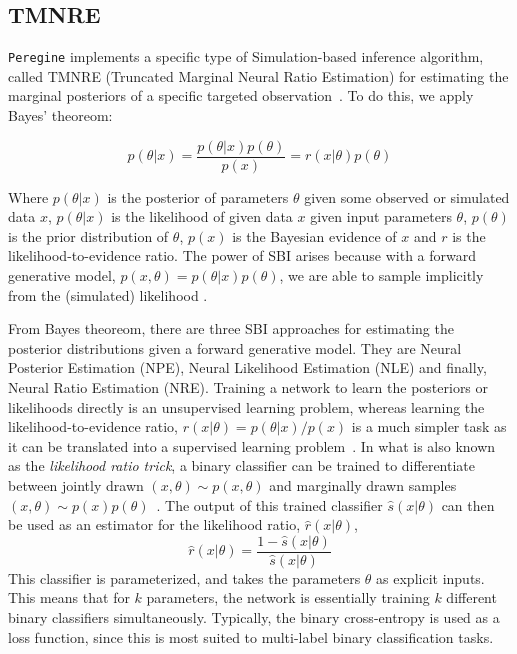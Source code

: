 \subsection{TMNRE}
\label{sec:tmnre}

\texttt{Peregine} implements a specific type of Simulation-based inference algorithm, called TMNRE (Truncated Marginal Neural Ratio Estimation) for estimating the marginal posteriors of a specific targeted observation~\cite{Miller_TMNRE_2021}. To do this, we apply Bayes' theoreom:

\begin{equation*}
    p(\theta|x) = \frac{p(\theta|x) p(\theta)}{p(x)} = r(x|\theta) p(\theta)
\end{equation*}

Where $p(\theta|x)$ is the posterior of parameters $\theta$ given some observed or simulated data $x$, $p(\theta|x)$ is the likelihood of given data $x$ given input parameters $\theta$, $p(\theta)$ is the prior distribution of $\theta$, $p(x)$ is the Bayesian evidence of $x$ and $r$ is the likelihood-to-evidence ratio. The power of SBI arises because with a forward generative model, $p(x,\theta)=p(\theta|x) p(\theta)$, we are able to sample implicitly from the (simulated) likelihood \cite{Cranmer_SBI_2020}.

From Bayes theoreom, there are three SBI approaches for estimating the posterior distributions given a forward generative model. They are Neural Posterior Estimation (NPE), Neural Likelihood Estimation (NLE) and finally, Neural Ratio Estimation (NRE). Training a network to learn the posteriors or likelihoods directly is an unsupervised learning problem, whereas learning the likelihood-to-evidence ratio, $r(x|\theta) = p(\theta|x) / p(x)$ is a much simpler task as it can be translated into a supervised learning problem~\cite{Cranmer_SBI_2020}. In what is also known as the \textit{likelihood ratio trick}, a binary classifier can be trained to differentiate between jointly drawn $(x,\theta) \sim p(x,\theta)$ and marginally drawn samples $(x,\theta) \sim p(x)p(\theta)$~\cite{Brehmer_Cranmer_2020}. The output of this trained classifier $\hat{s}(x|\theta)$ can then be used as an estimator for the likelihood ratio, $\hat{r}(x|\theta)$,
\begin{equation*}
    \hat{r}(x|\theta) = \frac{1-\hat{s}(x|\theta)}{\hat{s}(x|\theta)}
\end{equation*}
This classifier is parameterized, and takes the parameters $\theta$ as explicit inputs. This means that for $k$ parameters, the network is essentially training $k$ different binary classifiers simultaneously. Typically, the binary cross-entropy is used as a loss function, since this is most suited to multi-label binary classification tasks.

